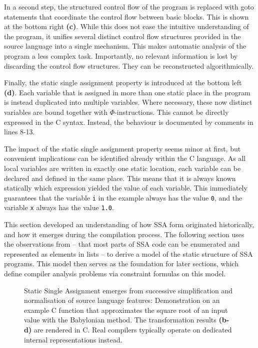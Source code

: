     In a second step, the structured control flow of the program is replaced
    with goto statements that coordinate the control flow between basic blocks.
    This is shown at the bottom right {\bf(c)}.
    While this does not ease the intuitive understanding of the program, it
    unifies several distinct control flow structures provided in the source
    language into a single mechanism.
    This makes automatic analysis of the program a less complex task.
    Importantly, no relevant information is lost by discarding the control flow
    structures.
    They can be reconstructed algorithmically.

    Finally, the static single assignment property is introduced at the bottom
    left {\bf(d)}.
    Each variable that is assigned in more than one static place in the program
    is instead duplicated into multiple variables.
    Where necessary, these now distinct variables are bound together with
    $\Phi$-instructions.
    This cannot be directly expressed in the C syntax.
    Instead, the behaviour is documented by comments in lines 8-13.

    The impact of the static single assignment property seems minor
    at first, but convenient implications can be identified already within the
    C language.
    As all local variables are written in exactly one static location, each
    variable can be declared and defined in the same place.
    This means that it is always known statically which expression yielded the
    value of each variable.
    This immediately guarantees that the variable \texttt{i} in the example
    always has the value \texttt{0}, and the variable \texttt{x} always has the
    value \texttt{1.0}.

    This section developed an understanding of how SSA form originated
    historically, and how it emerges during the compilation process.
    The following section uses the observations from
     -- that most parts of SSA code can be enumerated
    and represented as elements in lists -- to derive a model of the static
    structure of SSA programs.
    This model then serves as the foundation for later sections, which define
    compiler analysis problems via constraint formulas on this model.

\begin{figure}[p]
    
    \caption{Static Single Assignment emerges from successive simplification
             and normalisation of source language features: 
             Demonstration on an example C function that approximates the
             square root of an input value with the Babylonian method.
             The transformation results {\bf (b-d)} are rendered in C.
             Real compilers typically operate on
             dedicated internal representations instead.
             \parfillskip=0pt}
    \label{ssaexample}
\end{figure}

